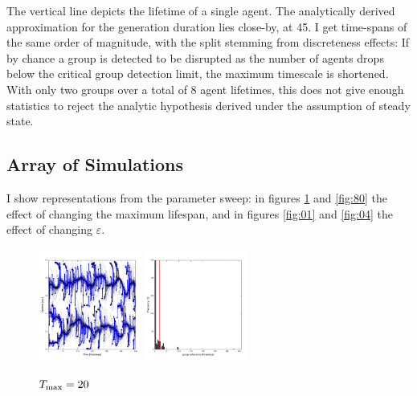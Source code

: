 \documentclass[useAMS,usenatbib]{templates/mn2e}
\begin{document}
The vertical line depicts the lifetime of a single agent. The
analytically derived approximation for the generation duration lies
close-by, at 45. I get time-spans of the same order of
magnitude, with the split stemming from discreteness effects: If by
chance a group is detected to be disrupted as the number of agents
drops below the critical group detection limit, the maximum timescale
is shortened. With only two groups over a total of 8 agent
lifetimes, this does not give enough statistics to reject the analytic
hypothesis derived under the assumption of steady state.


\subsection{Array of  Simulations}

I show representations from the parameter sweep: in figures
\ref{fig:20} and \ref{fig:80} the effect of changing the maximum
lifespan, and in figures \ref{fig:01} and \ref{fig:04} the effect of
changing $\varepsilon$.

\begin{figure}
  \begin{center}
    \includegraphics[width=0.3\textwidth]{fig/evol_20.pdf}
    \includegraphics[width=0.3\textwidth]{fig/var_20.pdf}
  \end{center}
  \caption{\label{fig:20}$T_{\rm max}=20$}
\end{figure}
\end{document}
